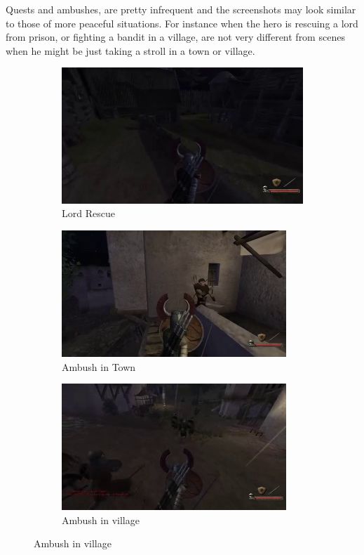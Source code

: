 \documentclass[
]{article}
\begin{document}
Quests and ambushes, are pretty infrequent and the screenshots may look
similar to those of more peaceful situations. For instance when the hero is rescuing a lord from prison, or fighting a bandit in a village, are not very different from scenes when he might be just taking a stroll in a town or village.


\begin{figure}[H]
	\centering
	\begin{subfigure}[b]{0.3\textwidth}
		\includegraphics[width=\linewidth]{docimages/E_0054_00_40_24.jpg}
		\caption{Lord Rescue}
	\end{subfigure}
	\begin{subfigure}[b]{0.3\textwidth}
		\includegraphics[width=\linewidth]{docimages/E_0063_00_27_08.jpg}
		\caption{Ambush in Town}
	\end{subfigure}
	\begin{subfigure}[b]{0.3\textwidth}
		\includegraphics[width=\linewidth]{docimages/E_0067_00_52_32.jpg}
		\caption{Ambush in village}
	\end{subfigure}
\end{figure}
\end{document}
